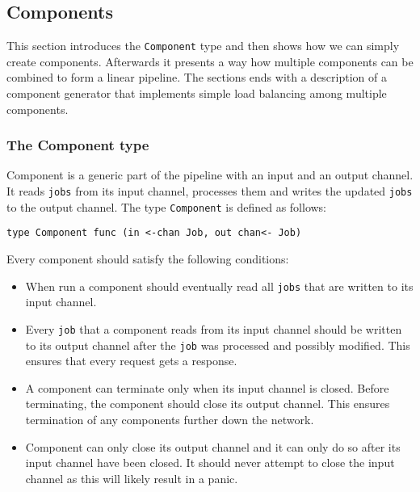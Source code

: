 \subsection{Components}
This section introduces the \texttt{Component} type and then shows how we can simply
create components. Afterwards it presents a way how multiple components can
be combined to form a linear pipeline. The sections ends with a description
of a component generator that implements simple load balancing among
multiple components.

\subsubsection{The Component type}
Component is a generic part of the pipeline with an input and 
an output channel. It reads \texttt{jobs} from its input channel, 
processes them and writes the updated \texttt{jobs} to the output 
channel. The type \texttt{Component} is defined as follows:
\begin{lstlisting}
type Component func (in <-chan Job, out chan<- Job)
\end{lstlisting}
Every component should satisfy the following conditions:
\begin{itemize}
    \item When run a component should eventually read all \texttt{jobs} that are
          written to its input channel.

    \item Every \texttt{job} that a component reads from its input channel
          should be written to its output channel after the \texttt{job} was processed
          and possibly modified. This ensures that every request gets a response.

    \item A component can terminate only when its input channel is closed. 
          Before terminating, the component should close its output channel.
          This ensures termination of any components further down the network.

    \item Component can only close its output channel and it can only do so
    	  after its input channel have been closed. It should never attempt
          to close the input channel as this will likely result in a panic.
\end{itemize}

